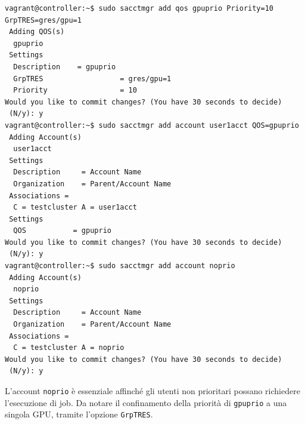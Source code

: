 \documentclass[12pt,a4paper,twoside,openright]{book}
\begin{document}
\begin{verbatim}
vagrant@controller:~$ sudo sacctmgr add qos gpuprio Priority=10 GrpTRES=gres/gpu=1
 Adding QOS(s)
  gpuprio
 Settings
  Description    = gpuprio
  GrpTRES                  = gres/gpu=1
  Priority                 = 10
Would you like to commit changes? (You have 30 seconds to decide)
 (N/y): y
vagrant@controller:~$ sudo sacctmgr add account user1acct QOS=gpuprio
 Adding Account(s)
  user1acct
 Settings
  Description     = Account Name
  Organization    = Parent/Account Name
 Associations =
  C = testcluster A = user1acct
 Settings
  QOS           = gpuprio
Would you like to commit changes? (You have 30 seconds to decide)
 (N/y): y
vagrant@controller:~$ sudo sacctmgr add account noprio
 Adding Account(s)
  noprio
 Settings
  Description     = Account Name
  Organization    = Parent/Account Name
 Associations =
  C = testcluster A = noprio
Would you like to commit changes? (You have 30 seconds to decide)
 (N/y): y
\end{verbatim}
L'account \texttt{noprio} è essenziale affinché gli utenti non prioritari possano richiedere l'esecuzione di job. Da notare il confinamento della priorità di \texttt{gpuprio} a una singola \ac{GPU}, tramite l'opzione \texttt{GrpTRES}.
\end{document}
